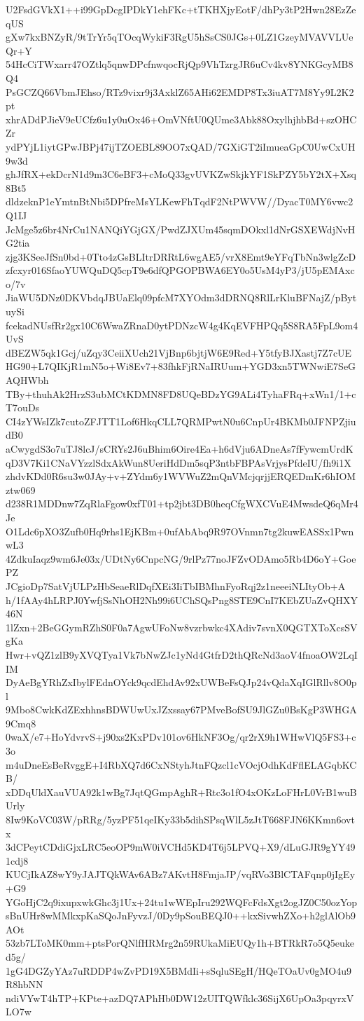 U2FsdGVkX1++i99GpDcgIPDkY1ehFKc+tTKHXjyEotF/dhPy3tP2Hwn28EzZeqUS
gXw7kxBNZyR/9tTrYr5qTOcqWykiF3RgU5hSsCS0JGs+0LZ1GzeyMVAVVLUeQr+Y
54HcCiTWxarr47OZtlq5qnwDPcfnwqocRjQp9VhTzrgJR6uCv4kv8YNKGcyMB8Q4
PsGCZQ66VbmJEhso/RTz9vixr9j3AxklZ65AHi62EMDP8Tx3iuAT7M8Yy9L2K2pt
xhrADdPJieV9eUCfz6u1y0uOx46+OmVNftU0QUme3Abk88OxylhjhbBd+szOHCZr
ydPYjL1iytGPwJBPj47ijTZOEBL89OO7xQAD/7GXiGT2iImueaGpC0UwCxUH9w3d
ghJfRX+ekDcrN1d9m3C6eBF3+cMoQ33gvUVKZwSkjkYF1SkPZY5bY2tX+Xsq8Bt5
dldzeknP1eYmtnBtNbi5DPfreMsYLKewFhTqdF2NtPWVW//DyacT0MY6vwc2Q1IJ
JcMge5z6br4NrCu1NANQiYGjGX/PwdZJXUm45sqmDOkxl1dNrGSXEWdjNvHG2tia
zjg3KSeeJfSn0bd+0Tto4zGsBLItrDRRtL6wgAE5/vrX8Emt9eYFqTbNn3wlgZcD
zfcxyr016SfaoYUWQuDQ5cpT9e6dfQPGOPBWA6EY0o5UsM4yP3/jU5pEMAxco/7v
JiaWU5DNz0DKVbdqJBUaElq09pfcM7XYOdm3dDRNQ8RlLrKluBFNajZ/pBytuySi
fcekadNUsfRr2gx10C6WwaZRnaD0ytPDNzcW4g4KqEVFHPQq5S8RA5FpL9om4UvS
dBEZW5qk1Gcj/uZqy3CeiiXUch21VjBnp6bjtjW6E9Red+Y5tfyBJXastj7Z7cUE
HG90+L7QIKjR1mN5o+Wi8Ev7+83fhkFjRNaIRUum+YGD3xn5TWNwiE7SeGAQHWbh
TBy+thuhAk2HrzS3ubMCtKDMN8FD8UQeBDzYG9ALi4TyhaFRq+xWn1/1+cT7ouDs
CI4zYWsIZk7cutoZFJTT1Lof6HkqCLL7QRMPwtN0u6CnpUr4BKMb0JFNPZjiudB0
aCwygdS3o7uTJ8lcJ/sCRYs2J6uBhim6Oire4Ea+h6dVju6ADneAs7fFywcmUrdK
qD3V7Ki1CNaVYzzlSdxAkWun8UeriHdDm5sqP3ntbFBPAsVrjysPfdeIU/fh9i1X
zhdvKDd0R6su3w0JAy+v+ZYdm6y1WVWuZ2mQnVMcjqrjjERQEDmKr6hIOMztw069
d238R1MDDnw7ZqRlaFgow0xfT01+tp2jbt3DB0heqCfgWXCVuE4MwsdeQ6qMr4Je
O1Ldc6pXO3Zufb0Hq9rhs1EjKBm+0ufAbAbq9R97OVnmn7tg2kuwEASSx1PwnwL3
4ZdkuIaqz9wm6Je03x/UDtNy6CnpcNG/9rlPz77noJFZvODAmo5Rb4D6oY+GoePZ
JCgioDp7SatVjULPzHbSeaeRlDqfXEi3IiTbIBMhnFyoRqj2z1neeeiNLItyOb+A
h/1fAAy4hLRPJ0YwfjSsNhOH2Nh99i6UChSQsPng8STE9CnI7KEbZUaZvQHXY46N
1lZxn+2BeGGymRZhS0F0a7AgwUFoNw8vzrbwkc4XAdiv7svnX0QGTXToXcsSVgKa
Hwr+vQZ1zlB9yXVQTya1Vk7bNwZJc1yNd4GtfrD2thQRcNd3aoV4fnoaOW2LqIIM
DyAeBgYRhZxIbylFEdnOYck9qcdEhdAv92xUWBeFsQJp24vQdaXqIGlRllv8O0pl
9Mbo8CwkKdZExhhnsBDWUwUxJZxssay67PMveBofSU9JlGZu0BsKgP3WHGA9Cmq8
0waX/e7+HoYdvrvS+j90xs2KxPDv101ov6HkNF3Og/qr2rX9h1WHwVlQ5FS3+c3o
m4uDneEsBeRvggE+I4RbXQ7d6CxNStyhJtnFQzcl1cVOcjOdhKdFflELAGqbKCB/
xDDqUldXauVUA92k1wBg7JqtQGmpAghR+Rtc3o1fO4xOKzLoFHrL0VrB1wuBUrly
8Iw9KoVC03W/pRRg/5yzPF51qeIKy33b5dihSPsqWlL5zJtT668FJN6KKmn6ovtx
3dCPeytCDdiGjxLRC5eoOP9mW0iVCHd5KD4T6j5LPVQ+X9/dLuGJR9gYY491cdj8
KUCjIkAZ8wY9yJAJTQkWAv6ABz7AKvtH8FmjaJP/vqRVo3BlCTAFqnp0jIgEy+G9
YGoHjC2q9ixupxwkGhc3j1Ux+24tu1wWEpIru292WQFcFdsXgt2ogJZ0C50ozYop
sBnUHr8wMMkxpKaSQoJnFyvzJ/0Dy9pSouBEQJ0++kxSivwhZXo+h2glAlOb9AOt
53zb7LToMK0mm+ptsPorQNlfHRMrg2n59RUkaMiEUQy1h+BTRkR7o5Q5euked5g/
1gG4DGZyYAz7uRDDP4wZvPD19X5BMdIi+sSqluSEgH/HQeTOaUv0gMO4u9R8hbNN
ndiVYwT4hTP+KPte+azDQ7APhHb0DW12zUITQWfklc36SijX6UpOa3pqyrxVLO7w
